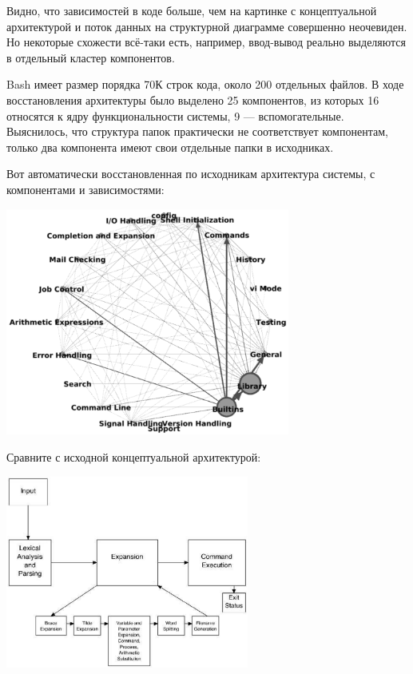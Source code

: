 \documentclass[a5paper]{article}
\begin{document}
Видно, что зависимостей в коде больше, чем на картинке с концептуальной архитектурой и поток данных на структурной диаграмме совершенно неочевиден. Но некоторые схожести всё-таки есть, например, ввод-вывод реально выделяются в отдельный кластер компонентов.

Bash имеет размер порядка 70К строк кода, около 200 отдельных файлов. В ходе восстановления архитектуры было выделено 25 компонентов, из которых 16 относятся к ядру функциональности системы, 9 --- вспомогательные. Выяснилось, что структура папок практически не соответствует компонентам, только два компонента имеют свои отдельные папки в исходниках.

Вот автоматически восстановленная по исходникам архитектура системы, с компонентами и зависимостями:

\begin{center}
	\includegraphics[width=0.7\textwidth]{bashAutomaticRecoveryArchitecture.png}
\end{center}

Сравните с исходной концептуальной архитектурой:

\begin{center}
	\includegraphics[width=0.6\textwidth]{bashArchitecture.png}
\end{center}
\end{document}
